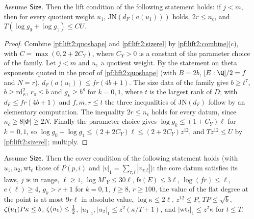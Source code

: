\begin{proposition}\label{pf:lift2:numpt}
Assume $\mathsf{Size}$. Then the lift condition of the following statement holds: if $j<m$, then for every
quotient weight $u_1$, $\mathrm{JN}(d_F(a(u_1)))$ holds, $2r\le n_c$, and $T(\log g_0+\log g_1)\le CU$.
\end{proposition}

\begin{proof}
Combine \cref{pf:lift2:quoshape} and \cref{pf:lift2:sizerel} by \cref{pf:lift2:combine}(c), with
$C=\max(0,2+2C_Y)$, where $C_Y>0$ is a constant of the parameter choice of the family. Let $j<m$ and $u_1$ a quotient
weight. By the statement on theta exponents quoted in the proof of \cref{pf:lift2:quoshape} (with $B=2b$,
$[E:\Q]/2=f$ and $N=r$), $d_F(a(u_1))\le fr(4b+1)$. The size data of the family give $b\ge t^7$, $b\ge\mathrm{rd}_E^2$,
$r_0\le b$ and $g_k\ge b^8$ for $k=0,1$, where $t$ is the largest rank of $D$; with $d_F\le fr(4b+1)$ and
$f,m,r\le t$ the three inequalities of $\mathrm{JN}(d_F)$ follow by an elementary computation. The inequality
$2r\le n_c$ holds for every datum, since $n_c\ge8|\Phi|\ge2N$. Finally the parameter choice gives
$\log g_k\le(1+C_Y)\ell$ for $k=0,1$, so $\log g_0+\log g_1\le(2+2C_Y)\ell\le(2+2C_Y)z^{12}$, and $Tz^{12}\le U$ by
\cref{pf:lift2:sizerel}; multiply.
\end{proof}

\begin{proposition}\label{pf:lift2:sizecov}
Assume $\mathsf{Size}$. Then the cover condition of the following statement holds (with $u_1,u_2,\mathrm{wt}_t$ those
of $P(p,i)$ and $|v|_1=\sum_{\tau,l}|v_{\tau,l}|$): the core datum satisfies its laws, $j$ is in range, $\ell\ge1$,
$\log M'_Y\le30\ell$, $\mathrm{fs}(E)\le3\ell$, $\log(fr)\le\ell$, $e(\ell)\ge4$, $g_k>r+1$ for $k=0,1$, $f\ge8$,
$r\ge100$, the value of the flat degree at the point is at most $9r\ell$ in absolute value, $\log\kappa\le2\ell$,
$z^{12}\le P$, $TP\le\sqrt b$, $\zeta(u_1)P\kappa\le b$, $\zeta(u_1)\le\frac12$, $|u_1|_1,|u_2|_1\le
z^2(\kappa/T+1)$, and $|\mathrm{wt}_t|_1\le z^2\kappa$ for $t\le T$.
\end{proposition}

